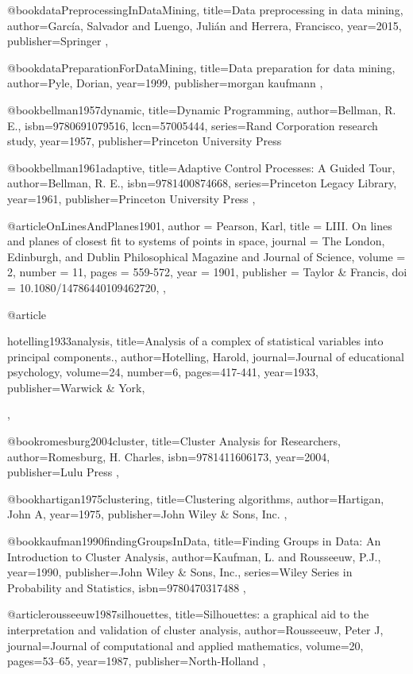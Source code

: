 @book{dataPreprocessingInDataMining,
  title={Data preprocessing in data mining},
  author={García, Salvador and Luengo, Julián and Herrera, Francisco},
  year={2015},
  publisher={Springer}
},

@book{dataPreparationForDataMining,
  title={Data preparation for data mining},
  author={Pyle, Dorian},
  year={1999},
  publisher={morgan kaufmann}
},

@book{bellman1957dynamic,
  title={Dynamic Programming},
  author={Bellman, R. E.},
  isbn={9780691079516},
  lccn={57005444},
  series={Rand Corporation research study},
  year={1957},
  publisher={Princeton University Press}
}

@book{bellman1961adaptive,
  title={Adaptive Control Processes: A Guided Tour},
  author={Bellman, R. E.},
  isbn={9781400874668},
  series={Princeton Legacy Library},
  year={1961},
  publisher={Princeton University Press}
},

@article{OnLinesAndPlanes1901,
author = {Pearson, Karl},
title = {LIII. On lines and planes of closest fit to systems of points in space},
journal = {The London, Edinburgh, and Dublin Philosophical Magazine and Journal of Science},
volume = {2},
number = {11},
pages = {559-572},
year  = {1901},
publisher = {Taylor & Francis},
doi = {10.1080/14786440109462720},
},

@article{hotelling1933analysis,
  title={Analysis of a complex of statistical variables into principal components.},
  author={Hotelling, Harold},
  journal={Journal of educational psychology},
  volume={24},
  number={6},
  pages={417-441},
  year={1933},
  publisher={Warwick \& York},

},

@book{romesburg2004cluster,
  title={Cluster Analysis for Researchers},
  author={Romesburg, H. Charles},
  isbn={9781411606173},
  year={2004},
  publisher={Lulu Press}
},

@book{hartigan1975clustering,
  title={Clustering algorithms},
  author={Hartigan, John A},
  year={1975},
  publisher={John Wiley \& Sons, Inc.}
},

@book{kaufman1990findingGroupsInData,
  title={Finding Groups in Data: An Introduction to Cluster Analysis},
  author={Kaufman, L. and Rousseeuw, P.J.},
  year={1990},
  publisher={John Wiley \& Sons, Inc.},
  series={Wiley Series in Probability and Statistics},
  isbn={9780470317488}
},

@article{rousseeuw1987silhouettes,
  title={Silhouettes: a graphical aid to the interpretation and validation of cluster analysis},
  author={Rousseeuw, Peter J},
  journal={Journal of computational and applied mathematics},
  volume={20},
  pages={53--65},
  year={1987},
  publisher={North-Holland}
},

